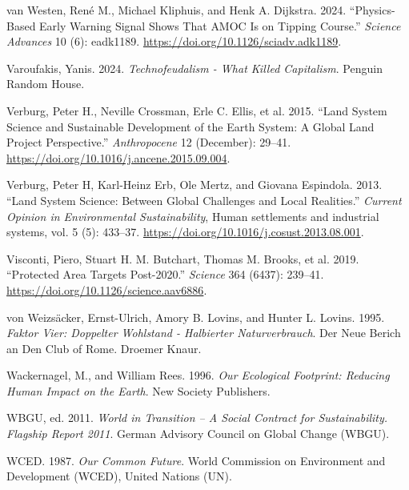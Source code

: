 \documentclass[
  a4paper,
  DIV=11,
  numbers=noendperiod,
  oneside,
  openany]{scrreprt}
\newlength{\cslhangindent}
\newenvironment{CSLReferences}[2] %
 {\begin{list}{}{%
  \setlength{\itemindent}{0pt}
  \setlength{\leftmargin}{0pt}
  \setlength{\parsep}{0pt}
  \ifodd #1
   \setlength{\leftmargin}{\cslhangindent}
   \setlength{\itemindent}{-1\cslhangindent}
  \fi
  \setlength{\itemsep}{#2\baselineskip}}}
 {\end{list}}
\begin{document}
\begin{CSLReferences}{1}{1}
{van Westen, René M., Michael Kliphuis, and Henk A. Dijkstra}. 2024.
{``Physics-Based Early Warning Signal Shows That {AMOC} Is on Tipping
Course.''} \emph{Science Advances} 10 (6): eadk1189.
\url{https://doi.org/10.1126/sciadv.adk1189}.

Varoufakis, Yanis. 2024. \emph{Technofeudalism - {What} Killed
Capitalism}. Penguin Random House.

Verburg, Peter H., Neville Crossman, Erle C. Ellis, et al. 2015. {``Land
System Science and Sustainable Development of the Earth System: {A}
Global Land Project Perspective.''} \emph{Anthropocene} 12 (December):
29--41. \url{https://doi.org/10.1016/j.ancene.2015.09.004}.

Verburg, Peter H, Karl-Heinz Erb, Ole Mertz, and Giovana Espindola.
2013. {``Land {System} {Science}: Between Global Challenges and Local
Realities.''} \emph{Current Opinion in Environmental Sustainability},
Human settlements and industrial systems, vol. 5 (5): 433--37.
\url{https://doi.org/10.1016/j.cosust.2013.08.001}.

Visconti, Piero, Stuart H. M. Butchart, Thomas M. Brooks, et al. 2019.
{``Protected Area Targets Post-2020.''} \emph{Science} 364 (6437):
239--41. \url{https://doi.org/10.1126/science.aav6886}.

{von Weizsäcker, Ernst-Ulrich, Amory B. Lovins, and Hunter L. Lovins}.
1995. \emph{Faktor {Vier}: {Doppelter Wohlstand} - Halbierter
{Naturverbrauch}}. Der Neue {Berich} an Den {Club} of {Rome}. Droemer
Knaur.

Wackernagel, M., and William Rees. 1996. \emph{Our {Ecological
Footprint}: {Reducing Human Impact} on the {Earth}}. New Society
Publishers.

WBGU, ed. 2011. \emph{World in {Transition} -- {A} {Social} {Contract}
for {Sustainability}. {Flagship} {Report} 2011}. German Advisory Council
on Global Change (WBGU).

WCED. 1987. \emph{Our {Common Future}}. {World Commission on Environment
and Development (WCED), United Nations (UN)}.


\end{CSLReferences}
\end{document}
